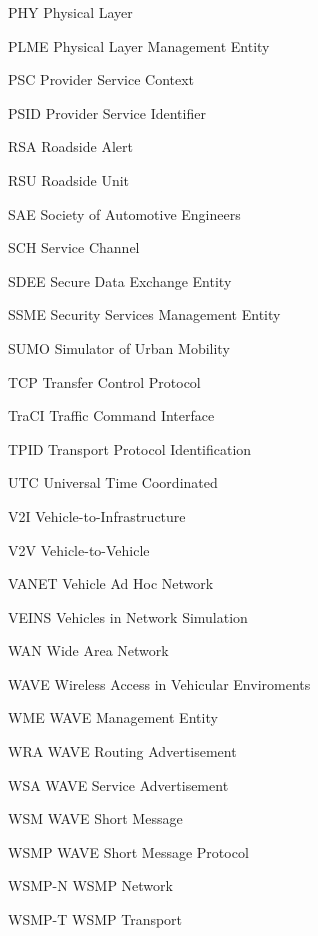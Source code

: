 \documentclass[
12pt,				%
openright,			%
oneside,			%
a4paper,			%
brazil,				%
]{abntex2}
\begin{document}
\begin{siglas}
		\item[PHY] Physical Layer
		\item[PLME] Physical Layer Management Entity
		\item[PSC] Provider Service Context 
		\item[PSID] Provider Service Identifier
		\item[RSA] Roadside Alert
		\item[RSU] Roadside Unit 	
		\item[SAE] Society of Automotive Engineers
		\item[SCH] Service Channel 
		\item[SDEE] Secure Data Exchange Entity
		\item[SSME] Security Services Management Entity
		\item[SUMO] Simulator of Urban Mobility
		\item[TCP] Transfer Control Protocol
		\item[TraCI] Traffic Command Interface 
		\item[TPID] Transport Protocol Identification
		\item[UTC] Universal Time Coordinated
		\item[V2I] Vehicle-to-Infrastructure 
		\item[V2V] Vehicle-to-Vehicle 
		\item[VANET] Vehicle Ad Hoc Network 
		\item[VEINS] Vehicles in Network Simulation 
		\item[WAN] Wide Area Network
		\item[WAVE] Wireless Access in Vehicular Enviroments
		\item[WME] WAVE Management Entity 
		\item[WRA] WAVE Routing Advertisement 
		\item[WSA] WAVE Service Advertisement
		\item[WSM] WAVE Short Message
		\item[WSMP] WAVE Short Message Protocol
		\item[WSMP-N] WSMP Network 
		\item[WSMP-T] WSMP Transport
		
		
	\end{siglas}
	
	\tableofcontents*
	\cleardoublepage
	
	
	
	
	\textual
	
\end{document}
